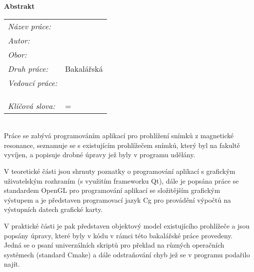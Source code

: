 \thispagestyle{empty}

\newbox\odstavecbox
\newlength\vyskaodstavce
\newcommand\odstavec[2]{
    \setbox\odstavecbox=\hbox{
         \parbox[t]{#1}{#2\vrule width 0pt depth 4pt}}
    \global\vyskaodstavce=\dp\odstavecbox
    \box\odstavecbox}
\newcommand{\delka}{120mm}


\newcommand{\pracovisteVed}{\km,\\ \fjfi,\\ \cvut}

\newcommand{\konzultant}{}
\newcommand{\pracovisteKonz}{}

\newcommand{\klicova}{programování, GUI, grafické uživatelské rozhraní, C++, Qt, DICOM}
\newcommand{\keywords}{programming, GUI, graphic user interface, C++, Qt, DICOM}   



{\noindent \bf \large Abstrakt} \\[5mm]
\begin{tabular}{ll}
	{\em Název práce:}	& \nazevcz	\\[1mm]
	{\em Autor:}		& \autor	\\[1mm]
	{\em Obor:} 		& \obor		\\[1mm]
	{\em Druh práce:}	& Bakalářská	\\[1mm]
	{\em Vedoucí práce:}	& \vedouci	\\
				& \km		\\
				& \fjfi		\\
				& \cvut		\\[1mm]
	{\em Klíčová slova:}	& \odstavec{\delka}{\klicova}	\\
\end{tabular}\\[5mm]
Práce se zabývá programováním aplikací pro prohlížení snímků z magnetické resonance, seznamuje se s existujícím prohlížečem snímků, který byl na fakultě vyvíjen, a popisuje drobné úpravy jež byly v programu udělány.

V teoretické části jsou shrnuty poznatky o programování aplikací s grafickým uživatelským rozhraním (s využitím frameworku Qt), dále je popsána práce se standardem OpenGL pro programování aplikací se složitějším grafickým výstupem a je představen programovací jazyk Cg pro provádění výpočtů na výstupních datech grafické karty.

V praktické části je pak představen objektový model existujícího prohlížeče a jsou popsány úpravy, které byly v kódu v rámci této bakalářské práce provedeny. Jedná se o psaní univerzálních skriptů pro překlad na různých operačních systémech (standard Cmake) a dále odstraňování chyb jež se v programu podařilo najít. \\[5mm]

